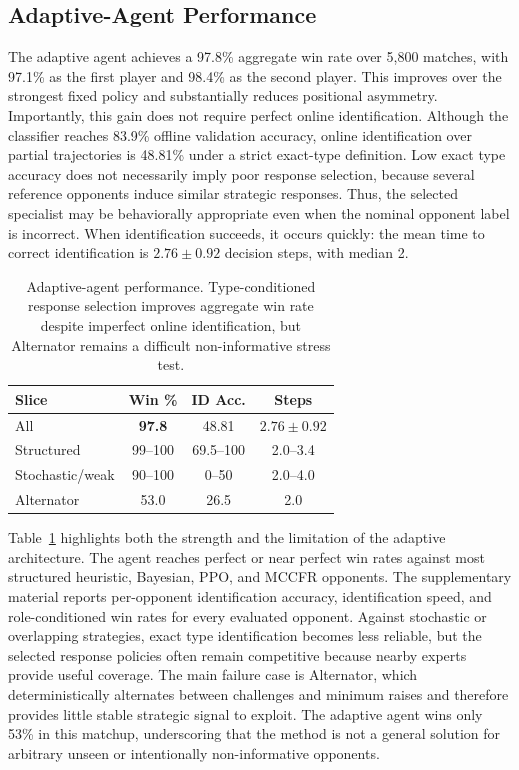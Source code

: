 \documentclass[letterpaper]{article} %
\begin{document}
\subsection{Adaptive-Agent Performance}
The adaptive agent achieves a 97.8\% aggregate win rate over 5{,}800 matches, with 97.1\% as the first player and 98.4\% as the second player. This improves over the strongest fixed policy and substantially reduces positional asymmetry. Importantly, this gain does not require perfect online identification. Although the classifier reaches 83.9\% offline validation accuracy, online identification over partial trajectories is 48.81\% under a strict exact-type definition. Low exact type accuracy does not necessarily imply poor response selection, because several reference opponents induce similar strategic responses. Thus, the selected specialist may be behaviorally appropriate even when the nominal opponent label is incorrect. When identification succeeds, it occurs quickly: the mean time to correct identification is $2.76 \pm 0.92$ decision steps, with median 2.


\begin{table}[t]
\centering
\small
\begin{tabular}{@{}lccc@{}}
\toprule
Slice & Win \% & ID Acc. & Steps \\
\midrule
All & \textbf{97.8} & 48.81 & $2.76\pm0.92$ \\
Structured & 99--100 & 69.5--100 & 2.0--3.4 \\
Stochastic/weak & 90--100 & 0--50 & 2.0--4.0 \\
Alternator & 53.0 & 26.5 & 2.0 \\
\bottomrule
\end{tabular}
\caption{Adaptive-agent performance. Type-conditioned response selection improves aggregate win rate despite imperfect online identification, but Alternator remains a difficult non-informative stress test.}
\label{tab:adaptive_summary}
\end{table}

Table~\ref{tab:adaptive_summary} highlights both the strength and the limitation of the adaptive architecture. The agent reaches perfect or near perfect win rates against most structured heuristic, Bayesian, PPO, and MCCFR opponents. The supplementary material reports per-opponent identification accuracy, identification speed, and role-conditioned win rates for every evaluated opponent. Against stochastic or overlapping strategies, exact type identification becomes less reliable, but the selected response policies often remain competitive because nearby experts provide useful coverage. The main failure case is Alternator, which deterministically alternates between challenges and minimum raises and therefore provides little stable strategic signal to exploit. The adaptive agent wins only 53\% in this matchup, underscoring that the method is not a general solution for arbitrary unseen or intentionally non-informative opponents.
\end{document}
